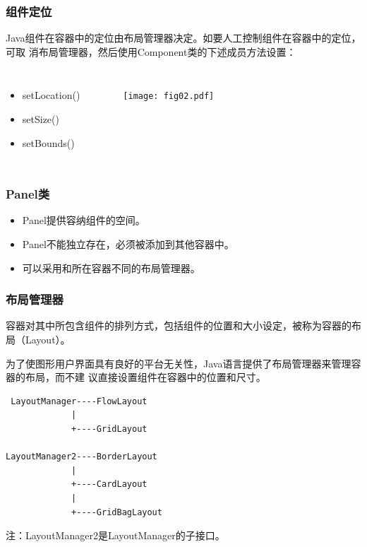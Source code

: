 \begin{frame}[fragile] %
  \frametitle{组件定位}

  Java组件在容器中的定位由{\hei 布局管理器}决定。如要人工控制组件在容器中的定位，可取
  消布局管理器，然后使用Component类的下述成员方法设置：

  \begin{columns}
    \begin{itemize}
    \item setLocation()
    \item setSize()
    \item setBounds()
    \end{itemize}

    \begin{figure}
      \centering
      \texttt{[image: fig02.pdf]}
    \end{figure}
  \end{columns}

\end{frame}

\begin{frame}[fragile] %
  \frametitle{Panel类}

  \begin{itemize}
  \item Panel提供容纳组件的空间。
  \item Panel不能独立存在，必须被添加到其他容器中。
  \item 可以采用和所在容器不同的布局管理器。
  \end{itemize}
\end{frame}

\begin{frame}[fragile] %
\frametitle{布局管理器}

容器对其中所包含组件的排列方式，包括组件的位置和大小设定，被称为容器的布局（Layout）。

为了使图形用户界面具有良好的平台无关性，Java语言提供了布局管理器来管理容器的布局，而不建
议直接设置组件在容器中的位置和尺寸。

{\small 
\begin{verbatim}
 LayoutManager----FlowLayout  
             |
             +----GridLayout

LayoutManager2----BorderLayout
             |
             +----CardLayout
             |
             +----GridBagLayout
\end{verbatim}}
注：LayoutManager2是LayoutManager的子接口。
\end{frame}


